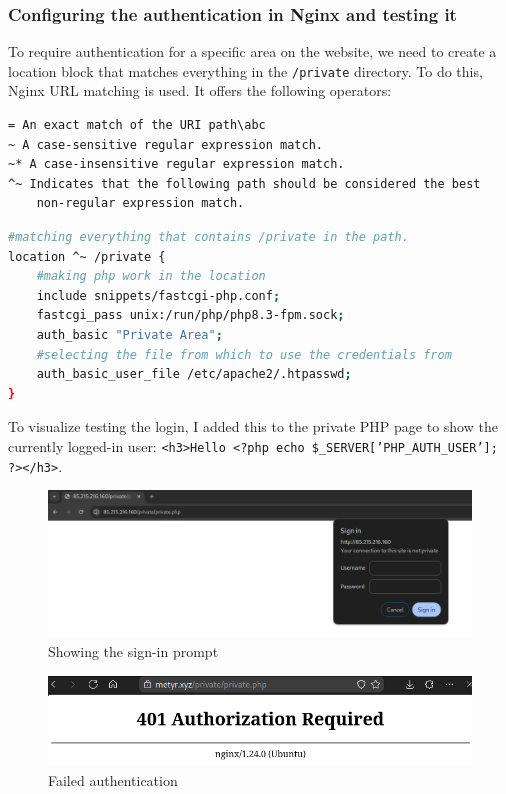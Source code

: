 \documentclass[a4paper]{article}
\newcommand{\abc}{\hfill \break}
\begin{document}
\subsubsection{Configuring the authentication in Nginx and testing it}
To require authentication for a specific area on the website, we need to create a location block that matches everything in the \texttt{/private} directory. To do this, Nginx URL matching is used.\cite{Nginx-url-matching}\abc
It offers the following operators:
\begin{lstlisting}[basicstyle=\color{black}\ttfamily,]
= An exact match of the URI path\abc
~ A case-sensitive regular expression match.
~* A case-insensitive regular expression match.
^~ Indicates that the following path should be considered the best
    non-regular expression match.
\end{lstlisting}
\begin{lstlisting}[language=bash]
#matching everything that contains /private in the path.
location ^~ /private {
	#making php work in the location
	include snippets/fastcgi-php.conf;
	fastcgi_pass unix:/run/php/php8.3-fpm.sock;
	auth_basic "Private Area";
	#selecting the file from which to use the credentials from
	auth_basic_user_file /etc/apache2/.htpasswd;
}
\end{lstlisting}
To visualize testing the login, I added this to the private PHP page to show the currently logged-in user: \texttt{<h3>Hello <?php echo \$\_SERVER['PHP\_AUTH\_USER']; ?></h3>}.\cite{php-show-basic-auth}
\newpage
\begin{figure}[!htbp]
	\includegraphics[scale=0.25]{images/siginprompt.png}
	\centering
	\caption{Showing the sign-in prompt}
\end{figure}
\begin{figure}[!htbp]
	\includegraphics[scale=0.38]{images/noauth.png}
	\centering
	\caption{Failed authentication}
\end{figure}
\end{document}
